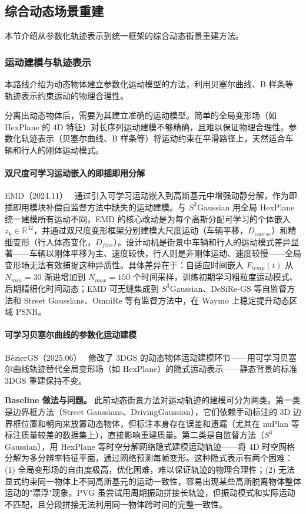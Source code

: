 \subsection{综合动态场景重建}
\label{ss:18_5}

本节介绍从参数化轨迹表示到统一框架的综合动态街景重建方法。

\subsubsection{运动建模与轨迹表示}

本路线介绍为动态物体建立参数化运动模型的方法，利用贝塞尔曲线、B 样条等轨迹表示约束运动的物理合理性。

分离出动态物体后，需要为其建立准确的运动模型。简单的全局变形场（如 HexPlane 的 4D 特征）对长序列运动建模不够精确，且难以保证物理合理性。参数化轨迹表示（贝塞尔曲线、B 样条等）将运动约束在平滑路径上，天然适合车辆和行人的刚体运动模式。

\paragraph{双尺度可学习运动嵌入的即插即用分解}

EMD（2024.11）~\cite{2411_15582} 通过引入可学习运动嵌入到高斯基元中增强动静分解，作为即插即用模块补偿自监督方法中缺失的运动建模。与 $S^3$Gaussian 用全局 HexPlane 统一建模所有运动不同，EMD 的核心改动是为每个高斯分配可学习的个体嵌入 $z_k \in \mathbb{R}^{32}$，并通过双尺度变形框架分别建模大尺度运动（车辆平移，$D_{coarse}$）和精细变形（行人体态变化，$D_{fine}$）。设计动机是街景中车辆和行人的运动模式差异显著——车辆以刚体平移为主、速度较快，行人则是非刚体运动、速度较慢——全局变形场无法有效捕捉这种异质性。具体差异在于：自适应时间嵌入 $F_{temp}(t)$ 从 $N_{min}=30$ 渐进增加到 $N_{max}=150$ 个时间采样，训练初期学习粗粒度运动模式、后期精细化时间动态；EMD 可无缝集成到 $S^3$Gaussian、DeSiRe-GS 等自监督方法和 Street Gaussians、OmniRe 等有监督方法中，在 Waymo 上稳定提升动态区域 PSNR。

\paragraph{可学习贝塞尔曲线的参数化运动建模}

B\'ezierGS（2025.06）~\cite{2506_22099} 修改了 3DGS 的动态物体运动建模环节——用可学习贝塞尔曲线轨迹替代全局变形场（如 HexPlane）的隐式运动表示——静态背景的标准 3DGS 重建保持不变。

\textbf{Baseline 做法与问题。} 此前动态街景方法对运动轨迹的建模可分为两类。第一类是边界框方法（Street Gaussians、DrivingGaussian），它们依赖手动标注的 3D 边界框位置和朝向来放置动态物体，但标注本身存在误差和遗漏（尤其在 nuPlan 等标注质量较差的数据集上），直接影响重建质量。第二类是自监督方法（$S^3$Gaussian），用 HexPlane 等时空分解网络隐式建模运动轨迹——将 4D 时空网格分解为多分辨率特征平面，通过网络预测每帧变形。这种隐式表示有两个困难：(1) 全局变形场的自由度极高，优化困难，难以保证轨迹的物理合理性；(2) 无法显式约束同一物体上不同高斯基元的运动一致性，容易出现某些高斯脱离物体整体运动的"漂浮"现象。PVG 虽尝试用周期振动拼接长轨迹，但振动模式和实际运动不匹配，且分段拼接无法利用同一物体跨时间的完整一致性。

